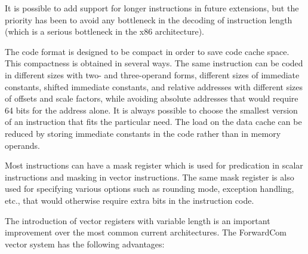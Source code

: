 \documentclass[forwardcom.tex]{subfiles}
\begin{document}
It is possible to add support for longer instructions in future extensions, but the priority has been to avoid any bottleneck in the decoding of instruction length (which is a serious bottleneck in the x86 architecture). 
\vspace{2mm}

The code format is designed to be compact in order to save code cache space. This compactness is obtained in several ways. The same instruction can be coded in different sizes with two- and three-operand forms, different sizes of immediate constants, shifted immediate constants, and relative addresses with different sizes of offsets and scale factors, while avoiding absolute addresses that would require 64 bits for the address alone. It is always possible to choose the smallest version of an instruction that fits the particular need. The load on the data cache can be reduced by storing immediate constants in the code rather than in memory operands.
\vspace{2mm}

Most instructions can have a mask register which is used for predication in scalar instructions and masking in vector instructions. The same mask register is also used for specifying various options such as rounding mode, exception handling, etc., that would otherwise require extra bits in the instruction code. 
\vspace{2mm}

The introduction of vector registers with variable length is an important improvement over the most common current architectures. The ForwardCom vector system has the following advantages: 
\end{document}

